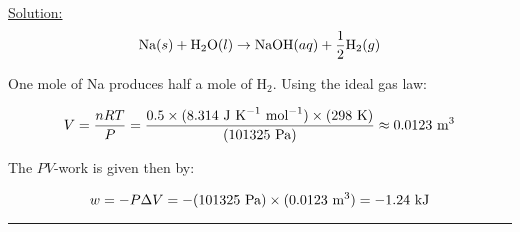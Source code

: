 \noindent
\underline{Solution:}\\

$$\textnormal{Na}(s) + \textnormal{H}_2\textnormal{O}(l) \rightarrow \textnormal{NaOH}(aq) + \frac{1}{2}\textnormal{H}_2(g)$$

One mole of Na produces half a mole of H$_2$. Using the ideal gas law:

$$V = \frac{nRT}{P} = \frac{0.5\times(8.314\textnormal{ J K}^{-1}\textnormal{ mol}^{-1})\times(298\textnormal{ K})}{(101325\textnormal{ Pa})} \approx 0.0123\textnormal{ m}^3$$

The $PV$-work is given then by:

$$w = -P\Delta V = -(101325\textnormal{ Pa})\times (0.0123\textnormal{ m}^3) = -1.24\textnormal{ kJ}$$

\hrule\vspace{0.5cm}
